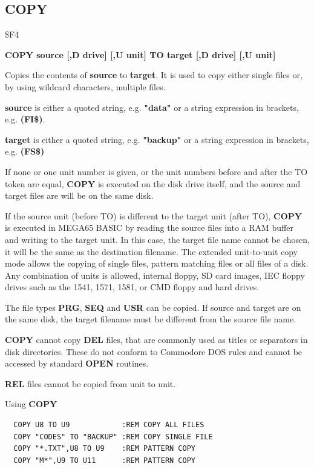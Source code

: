 \subsection{COPY}
\begin{description}[leftmargin=2cm,style=nextline]
\item [Token:] \$F4
\item [Format:] {\bf COPY source [,D drive] [,U unit] TO
                target [,D drive] [,U unit] }
\item [Usage:]
   Copies the contents of
   {\bf source} to {\bf target}.
   It is used to copy either single files or, by using
   wildcard characters, multiple files.

   {\bf source} is either a quoted string, e.g. {\bf "data"} or
   a string expression in brackets, e.g. {\bf (FI\$)}.

   {\bf target} is either a quoted string, e.g. {\bf "backup"} or
   a string expression in brackets, e.g. {\bf (FS\$)}

   \drivedefinition

   \unitdefinition

   If none or one unit number is given, or the unit numbers before and after
   the TO token are equal, {\bf COPY} is executed on the disk drive
   itself, and the source and target files are will be on the same disk.

   If the source unit (before TO) is different to the target unit (after TO),
   {\bf COPY} is executed in MEGA65 BASIC by reading the source
   files into a RAM buffer and writing to the target unit. In this case,
   the target file name cannot be chosen, it will be the same as the
   destination filename. The extended unit-to-unit copy mode allows the copying of
   single files, pattern matching files or all files of a disk.
   Any combination of units is allowed, internal floppy, SD card images,
   IEC floppy drives such as the 1541, 1571, 1581, or CMD floppy and hard drives.

\item [Remarks:]
   The file types {\bf PRG}, {\bf SEQ} and {\bf USR} can be copied.
   If source and target are on the same disk, the target filename
   must be different from the source file name.

   {\bf COPY} cannot copy {\bf DEL} files, that are commonly used
   as titles or separators in disk directories. These do not conform to
   Commodore DOS rules and cannot be accessed by standard {\bf OPEN} routines.

   {\bf REL} files cannot be copied from unit to unit.

\item [Examples:] Using {\bf COPY}
\begin{tcolorbox}[colback=black,coltext=white]
\verbatimfont{\codefont}
\begin{verbatim}
  COPY U8 TO U9            :REM COPY ALL FILES
  COPY "CODES" TO "BACKUP" :REM COPY SINGLE FILE
  COPY "*.TXT",U8 TO U9    :REM PATTERN COPY
  COPY "M*",U9 TO U11      :REM PATTERN COPY
\end{verbatim}
\end{tcolorbox}
\end{description}

